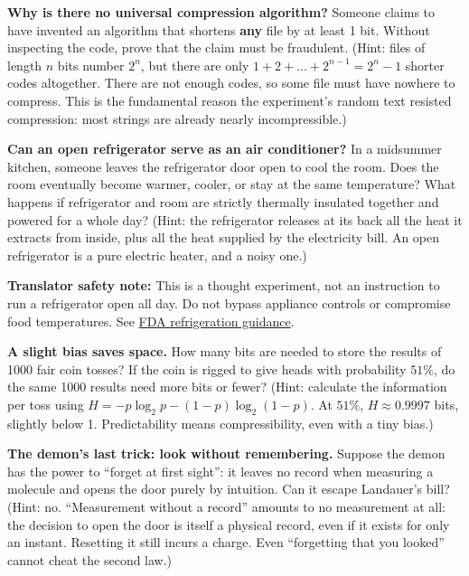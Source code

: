 \begin{puzzles}
\item \textbf{Why is there no universal compression algorithm?} Someone claims to have invented an algorithm that shortens \textbf{any} file by at least 1 bit. Without inspecting the code, prove that the claim must be fraudulent. (Hint: files of length $n$ bits number $2^n$, but there are only $1+2+\dots+2^{n-1}=2^n-1$ shorter codes altogether. There are not enough codes, so some file must have nowhere to compress. This is the fundamental reason the experiment's random text resisted compression: most strings are already nearly incompressible.)

\item \textbf{Can an open refrigerator serve as an air conditioner?} In a midsummer kitchen, someone leaves the refrigerator door open to cool the room. Does the room eventually become warmer, cooler, or stay at the same temperature? What happens if refrigerator and room are strictly thermally insulated together and powered for a whole day? (Hint: the refrigerator releases at its back all the heat it extracts from inside, plus all the heat supplied by the electricity bill. An open refrigerator is a pure electric heater, and a noisy one.)

\textbf{Translator safety note:} This is a thought experiment, not an instruction to run a refrigerator open all day. Do not bypass appliance controls or compromise food temperatures. See \href{https://www.fda.gov/food/food-safety-during-emergencies/power-outages-key-tips-consumers-about-food-safety}{FDA refrigeration guidance}.

\item \textbf{A slight bias saves space.} How many bits are needed to store the results of 1000 fair coin tosses? If the coin is rigged to give heads with probability $51\%$, do the same 1000 results need more bits or fewer? (Hint: calculate the information per toss using $H=-p\log_2 p-(1-p)\log_2(1-p)$. At $51\%$, $H\approx0.9997$ bits, slightly below 1. Predictability means compressibility, even with a tiny bias.)

\item \textbf{The demon's last trick: look without remembering.} Suppose the demon has the power to ``forget at first sight'': it leaves no record when measuring a molecule and opens the door purely by intuition. Can it escape Landauer's bill? (Hint: no. ``Measurement without a record'' amounts to no measurement at all: the decision to open the door is itself a physical record, even if it exists for only an instant. Resetting it still incurs a charge. Even ``forgetting that you looked'' cannot cheat the second law.)
\end{puzzles}

